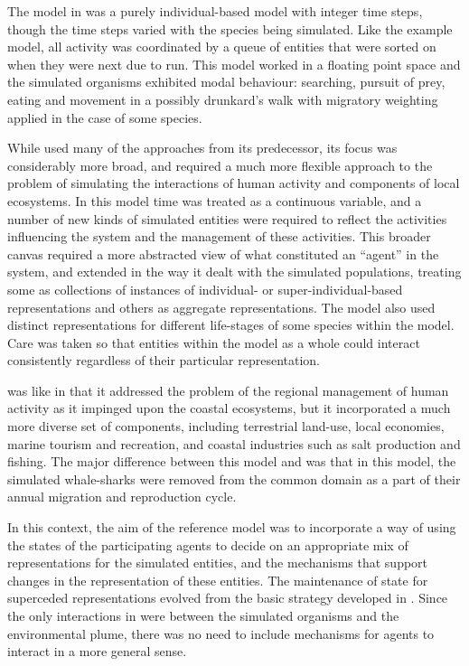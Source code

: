 The model in \cite{lyne1994pmez5} was a purely individual-based model
with integer time steps, though the time steps varied with the species
being simulated. Like the example model, all activity was coordinated
by a queue of entities that were sorted on when they were next due to
run. This model worked in a floating point space and the simulated
organisms exhibited modal behaviour: searching, pursuit of prey,
eating and movement in a possibly drunkard's walk with migratory
weighting applied in the case of some species.

While \cite{gray2006nws} used many of the approaches from its
predecessor, its focus was considerably more broad, and required a
much more flexible approach to the problem of simulating the
interactions of human activity and components of local ecosystems. In
this model time was treated as a continuous variable, and a number of
new kinds of simulated entities were required to reflect the
activities influencing the system and the management of these
activities. This broader canvas required a more abstracted view of
what constituted an ``agent'' in the system, and extended
\cite{lyne1994pmez5} in the way it dealt with the simulated
populations, treating some as collections of instances of individual-
or super-individual-based representations and others as aggregate
representations.  The model also used distinct representations for
different life-stages of some species within the model.  Care was
taken so that entities within the model as a whole could interact
consistently regardless of their particular representation.

\cite{gray2014} was like \cite{gray2006nws} in that it addressed the
problem of the regional management of human activity as it impinged
upon the coastal ecosystems, but it incorporated a much more diverse
set of components, including terrestrial land-use, local economies,
marine tourism and recreation, and coastal industries such as salt
production and fishing. The major difference between this model and
\cite{gray2006nws} was that in this model, the simulated whale-sharks were
removed from the common domain as a part of their annual migration and
reproduction cycle. 

In this context, the aim of the reference model was to incorporate a
way of using the states of the participating agents to decide on an
appropriate mix of representations for the simulated entities, and the
mechanisms that support changes in the representation of these
entities. The maintenance of state for superceded representations
evolved from the basic strategy developed in \Ctwo.  Since the only
interactions in \Ctwo were between the simulated organisms and the
environmental plume, there was no need to include mechanisms for
agents to interact in a more general sense.

